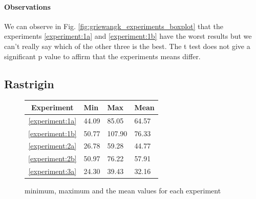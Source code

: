 \documentclass{article}
\begin{document}
\paragraph{Observations} We can observe in Fig. \ref{fig:griewangk_experiments_boxplot} that the experiments \ref{experiment:1a} and \ref{experiment:1b} have the worst results but we can't really say which of the other three is the best. The t test does not give a significant p value to affirm that the experiments means differ.

\subsection{Rastrigin}

\begin{figure}[!htbp]
	\begin{tabular}{||c|||l|l|l||}
		\hline
		Experiment & Min & Max & Mean \\ \hline \hline
		\ref{experiment:1a} & 44.09 & 85.05 & 64.57  \\ \hline
		\ref{experiment:1b} & 50.77 & 107.90 & 76.33 \\ \hline
		\ref{experiment:2a} & 26.78 & 59.28 & 44.77  \\ \hline
		\ref{experiment:2b} & 50.97 & 76.22 & 57.91  \\ \hline
		\ref{experiment:3a} & 24.30 & 39.43 & 32.16  \\ \hline
	\end{tabular}
	\caption{minimum, maximum and the mean values for each experiment}
\end{figure}
\FloatBarrier
\end{document}
